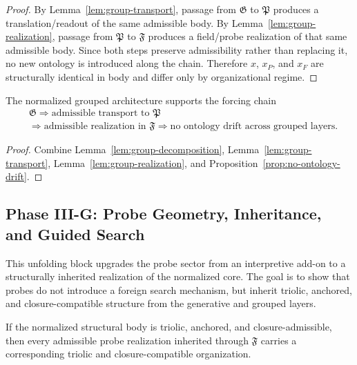 \begin{proof}
By Lemma~\ref{lem:group-transport}, passage from $\mathfrak G$ to $\mathfrak P$
produces a translation/readout of the same admissible body. By
Lemma~\ref{lem:group-realization}, passage from $\mathfrak P$ to $\mathfrak F$
produces a field/probe realization of that same admissible body. Since both
steps preserve admissibility rather than replacing it, no new ontology is
introduced along the chain. Therefore $x$, $x_P$, and $x_F$ are structurally
identical in body and differ only by organizational regime.
\end{proof}

\begin{corollary}
\label{cor:first-grouped-transport-forcing-chain}
The normalized grouped architecture supports the forcing chain
\[
\begin{aligned}
&\mathfrak G \Longrightarrow \text{admissible transport to }\mathfrak P\\
&\Longrightarrow \text{admissible realization in }\mathfrak F \Longrightarrow \text{no ontology drift across grouped layers}.
\end{aligned}
\]
\end{corollary}

\begin{proof}
Combine Lemma~\ref{lem:group-decomposition}, Lemma~\ref{lem:group-transport},
Lemma~\ref{lem:group-realization}, and
Proposition~\ref{prop:no-ontology-drift}.
\end{proof}


\subsection*{Phase III-G: Probe Geometry, Inheritance, and Guided Search}

This unfolding block upgrades the probe sector from an interpretive add-on to a
structurally inherited realization of the normalized core. The goal is to show
that probes do not introduce a foreign search mechanism, but inherit triolic,
anchored, and closure-compatible structure from the generative and grouped
layers.

\begin{lemma}
\label{lem:probe-inheritance}
If the normalized structural body is triolic, anchored, and closure-admissible,
then every admissible probe realization inherited through $\mathfrak F$ carries a
corresponding triolic and closure-compatible organization.
\end{lemma}

